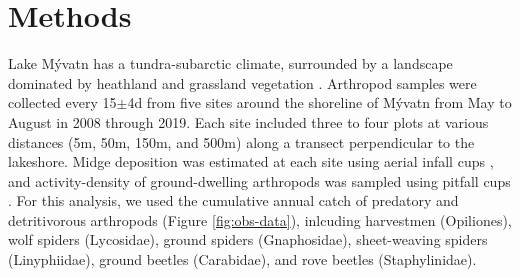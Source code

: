 

\section*{Methods}

Lake M\'{y}vatn has a tundra-subarctic climate, surrounded by a landscape
dominated by heathland and grassland vegetation \citep{Einarsson2004}.
Arthropod samples were collected every 15$\pm$4d from five sites around the
shoreline of M\'{y}vatn from May to August in 2008 through 2019.
Each site included three to four plots at various distances
(5m, 50m, 150m, and 500m) along a transect perpendicular to the lakeshore.
Midge deposition was estimated at each site using aerial infall cups \citep{Dreyer2015},
and activity-density of ground-dwelling arthropods was sampled using pitfall cups
\citep{Southwood2009}.
For this analysis, we used the cumulative annual catch of predatory and
detritivorous arthropods (Figure \ref{fig:obs-data}),
inlcuding harvestmen (Opiliones),
wolf spiders (Lycosidae),
ground spiders (Gnaphosidae),
sheet-weaving spiders (Linyphiidae),
ground beetles (Carabidae),
and rove beetles (Staphylinidae).

